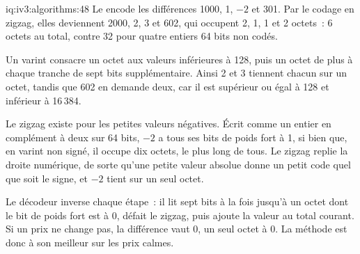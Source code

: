 \begin{solution}{iq:iv3:algorithms:48}
Le  encode les différences 1000, 1, $-2$ et 301. Par le codage en zigzag, elles deviennent 2000, 2, 3 et 602, qui occupent 2, 1, 1 et 2 octets~: 6 octets au total, contre 32 pour quatre entiers 64 bits non codés.
\enlargethispage{-3\baselineskip}%
\label{lst:iv3:al:varint}

Un varint consacre un octet aux valeurs inférieures à 128, puis un octet de plus à chaque tranche de sept bits supplémentaire. Ainsi 2 et 3 tiennent chacun sur un octet, tandis que 602 en demande deux, car il est supérieur ou égal à 128 et inférieur à 16\,384.

Le zigzag existe pour les petites valeurs négatives. Écrit comme un entier en complément à deux sur 64 bits, $-2$ a tous ses bits de poids fort à 1, si bien que, en varint non signé, il occupe dix octets, le plus long de tous. Le zigzag replie la droite numérique, de sorte qu'une petite valeur absolue donne un petit code quel que soit le signe, et $-2$ tient sur un seul octet.

Le décodeur inverse chaque étape~: il lit sept bits à la fois jusqu'à un octet dont le bit de poids fort est à 0, défait le zigzag, puis ajoute la valeur au total courant. Si un prix ne change pas, la différence vaut 0, un seul octet à 0. La méthode est donc à son meilleur sur les prix calmes.

\end{solution}

